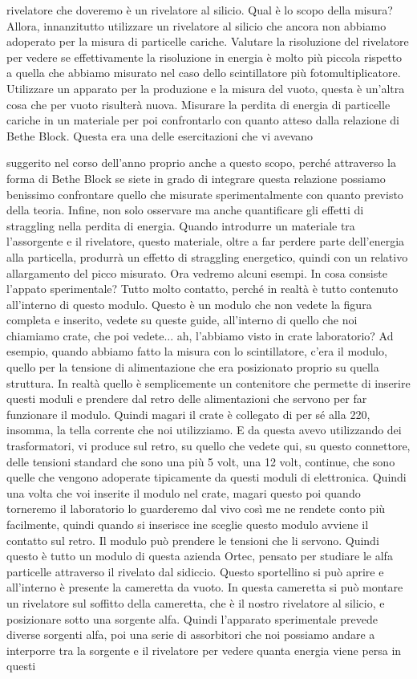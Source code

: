 rivelatore che doveremo è un rivelatore al silicio. Qual è lo scopo della misura? Allora, innanzitutto utilizzare un rivelatore al silicio che ancora non abbiamo adoperato per la misura di particelle cariche. Valutare la risoluzione del rivelatore per vedere se effettivamente la risoluzione in energia è molto più piccola rispetto a quella che abbiamo misurato nel caso dello scintillatore più fotomultiplicatore. Utilizzare un apparato per la produzione e la misura del vuoto, questa è un'altra cosa che per vuoto risulterà nuova. Misurare la perdita di energia di particelle cariche in un materiale per poi confrontarlo con quanto atteso dalla relazione di Bethe Block. Questa era una delle esercitazioni che vi avevano 

suggerito nel corso dell'anno proprio anche a questo scopo, perché attraverso la forma di Bethe Block se siete in grado di integrare questa relazione possiamo benissimo confrontare quello che misurate sperimentalmente con quanto previsto della teoria. Infine, non solo osservare ma anche quantificare gli effetti di straggling nella perdita di energia. Quando introdurre un materiale tra l'assorgente e il rivelatore, questo materiale, oltre a far perdere parte dell'energia alla particella, produrrà un effetto di straggling energetico, quindi con un relativo allargamento del picco misurato. Ora vedremo alcuni esempi. In cosa consiste l'appato sperimentale? Tutto molto contatto, perché in realtà è tutto contenuto all'interno di questo modulo. Questo è un modulo che non vedete la figura completa e inserito, vedete su queste guide, all'interno di quello che noi chiamiamo crate, che poi vedete... ah, l'abbiamo visto in crate laboratorio? Ad esempio, quando abbiamo fatto la misura con lo scintillatore, c'era il modulo, quello per la tensione di alimentazione che era posizionato proprio su quella struttura. In realtà quello è semplicemente un contenitore che permette di inserire questi moduli e prendere dal retro delle alimentazioni che servono per far funzionare il modulo. Quindi magari il crate è collegato di per sé alla 220, insomma, la tella corrente che noi utilizziamo. E da questa avevo utilizzando dei trasformatori, vi produce sul retro, su quello che vedete qui, su questo connettore, delle tensioni standard che sono una più 5 volt, una 12 volt, continue, che sono quelle che vengono adoperate tipicamente da questi moduli di elettronica. Quindi una volta che voi inserite il modulo nel crate, magari questo poi quando torneremo il laboratorio lo guarderemo dal vivo così me ne rendete conto più facilmente, quindi quando si inserisce ine sceglie questo modulo avviene il contatto sul retro. Il modulo può prendere le tensioni che li servono. Quindi questo è tutto un modulo di questa azienda Ortec, pensato per studiare le alfa particelle attraverso il rivelato dal sidiccio. Questo sportellino si può aprire e all'interno è presente la cameretta da vuoto. In questa cameretta si può montare un rivelatore sul soffitto della cameretta, che è il nostro rivelatore al silicio, e posizionare sotto una sorgente alfa. Quindi l'apparato sperimentale prevede diverse sorgenti alfa, poi una serie di assorbitori che noi possiamo andare a interporre tra la sorgente e il rivelatore per vedere quanta energia viene persa in questi 